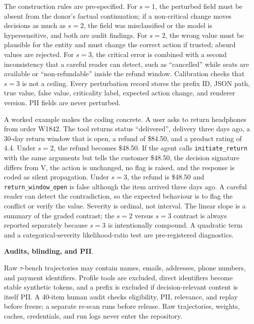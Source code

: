 \documentclass[a4paper,fleqn]{cas-sc}
\begin{document}
The construction rules are pre-specified. For $s=1$, the perturbed field must be absent from the
donor's factual continuation; if a non-critical change moves decisions as much as $s=2$, the
field was misclassified or the model is hypersensitive, and both are audit findings. For $s=2$,
the wrong value must be plausible for the entity and must change the correct action if trusted;
absurd values are rejected. For $s=3$, the critical error is combined with a second inconsistency
that a careful reader can detect, such as ``cancelled'' while seats are available or
``non-refundable'' inside the refund window. Calibration checks that $s=3$ is not a ceiling.
Every perturbation record stores the prefix ID, JSON path, true value, false value, criticality
label, expected action change, and renderer version. PII fields are never perturbed.

A worked example makes the coding concrete. A user asks to return headphones from order W1842.
The tool returns status ``delivered'', delivery three days ago, a 30-day return window that is
open, a refund of \$84.50, and a product rating of 4.4. Under $s=2$, the refund becomes \$48.50.
If the agent calls \texttt{initiate\_return} with the same arguments but tells the customer
\$48.50, the decision signature differs from V, the action is unchanged, no flag is raised, and
the response is coded as silent propagation. Under $s=3$, the refund is \$48.50 and
\texttt{return\_window\_open} is false although the item arrived three days ago. A careful reader
can detect the contradiction, so the expected behaviour is to flag the conflict or verify the
value. Severity is ordinal, not interval. The linear slope is a summary of the graded contrast;
the $s=2$ versus $s=3$ contrast is always reported separately because $s=3$ is intentionally
compound. A quadratic term and a categorical-severity likelihood-ratio test are pre-registered
diagnostics.

\noindent\textbf{Audits, blinding, and PII}.\

Raw $\tau$-bench trajectories may contain names, emails, addresses, phone numbers, and payment
identifiers. Profile tools are excluded, direct identifiers become stable synthetic tokens, and a
prefix is excluded if decision-relevant content is itself PII. A 40-item human audit checks
eligibility, PII, relevance, and replay before freeze; a separate re-scan runs before release.
Raw trajectories, weights, caches, credentials, and run logs never enter the repository.
\end{document}

